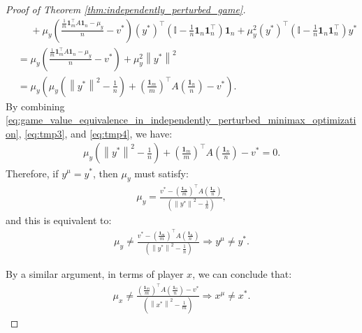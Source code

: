 \documentclass{article}
\newcommand{\bone}{\mathbf{1}}
\theoremstyle{plain}
\begin{document}
\begin{proof}[Proof of Theorem \ref{thm:independently_perturbed_game}]
\begin{align}
        & \phantom{=} + \mu_y\left(\frac{\frac{1}{m}\bone_m^{\top}A\bone_n - \mu_y}{n} - v^{\ast}\right)(y^{\ast})^{\top}\left(\mathbb{I} - \frac{1}{n}\bone_n\bone_n^{\top}\right)\bone_n + \mu_y^2 (y^{\ast})^{\top}\left(\mathbb{I} - \frac{1}{n}\bone_n\bone_n^{\top}\right)y^{\ast} \nonumber                        \\
        & = \mu_y\left(\frac{\frac{1}{m}\bone_m^{\top}A\bone_n - \mu_y}{n} - v^{\ast}\right) + \mu_y^2 \left\|y^{\ast}\right\|^2 \nonumber                                                                                                                                                                                \\
        & = \mu_y \left(\mu_y \left(\left\|y^{\ast}\right\|^2 - \frac{1}{n}\right) + \left(\frac{\bone_m}{m}\right)^{\top}A\left(\frac{\bone_n}{n}\right) - v^{\ast}\right).
        \label{eq:tmp4}
    \end{align}
    By combining \eqref{eq:game_value_equivalence_in_independently_perturbed_minimax_optimization}, \eqref{eq:tmp3}, and \eqref{eq:tmp4}, we have:
    \begin{align*}
        \mu_y \left(\left\|y^{\ast}\right\|^2 - \frac{1}{n}\right) + \left(\frac{\bone_m}{m}\right)^{\top}A\left(\frac{\bone_n}{n}\right) - v^{\ast} = 0.
    \end{align*}
    Therefore, if $y^{\mu} = y^{\ast}$, then $\mu_y$ must satisfy:
    \begin{align*}
        \mu_y = \frac{v^{\ast} - \left(\frac{\bone_m}{m}\right)^{\top}A\left(\frac{\bone_n}{n}\right)}{\left(\left\|y^{\ast}\right\|^2 - \frac{1}{n}\right)},
    \end{align*}
    and this is equivalent to:
    \begin{align*}
        \mu_y \neq \frac{v^{\ast} - \left(\frac{\bone_m}{m}\right)^{\top}A\left(\frac{\bone_n}{n}\right)}{\left(\left\|y^{\ast}\right\|^2 - \frac{1}{n}\right)} \Rightarrow y^{\mu} \neq y^{\ast}.
    \end{align*}

    By a similar argument, in terms of player $x$, we can conclude that:
    \begin{align*}
        \mu_x \neq \frac{\left(\frac{\bone_m}{m}\right)^{\top}A\left(\frac{\bone_n}{n}\right) - v^{\ast}}{\left(\left\|x^{\ast}\right\|^2 - \frac{1}{m}\right)} \Rightarrow x^{\mu} \neq x^{\ast}.
    \end{align*}
\end{proof}
\end{document}

